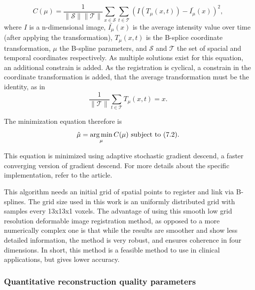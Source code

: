 \begin{equation}
C(\mu)=\frac{1}{\lVert \mathcal{S} \rVert\lVert \mathcal{T}\rVert}\sum_{x\in \mathcal{S}} \sum_{t\in\mathcal{T}}\left(I(T_\mu(x,t)) - \bar{I_\mu}(x)\right)^2,
\end{equation}
where $I$ is a n-dimensional image, $\bar{I_\mu}(x)$ is the average intensity value over time (after applying the transformation), $T_\mu(x,t)$ is the B-splice coordinate transformation, $\mu$ the B-spline parameters, and $\mathcal{S}$ and $\mathcal{T}$ the set of spacial and temporal coordinates respectively. As multiple solutions exist for this equation, an additional constrain is added. As the registration is cyclical, a constrain in the coordinate transformation is added, that the average transformation must be the identity, as in
\begin{equation}
\frac{1}{\lVert \mathcal{T}\rVert}\sum_{t\in\mathcal{T}}T_\mu(x,t)=x.
\end{equation}

The minimization equation therefore is
\begin{equation}
\hat{\mu}=\mathop{\mathrm{arg\,min}}_\mu C(\mu) \text{  subject to  } (7.2).
\end{equation}

This equation is minimized using adaptive stochastic gradient descend, a faster converging version of gradient descend\cite{klein2009adaptive}. For more details about the specific implementation, refer to the article\cite{metz2011nonrigid}.

This algorithm needs an initial grid of spatial points to register and link via B-splines. The grid size used in this work is an uniformly distributed grid with samples every 13x13x1 voxels. The advantage of using this smooth low grid resolution deformable image registration method, as opposed to a more numerically complex one is that while the results are smoother and show less detailed information, the method is very robust, and ensures coherence in four dimensions. In short, this method is a feasible method to use in clinical applications, but gives lower accuracy.
\subsubsection{Quantitative reconstruction quality parameters}

